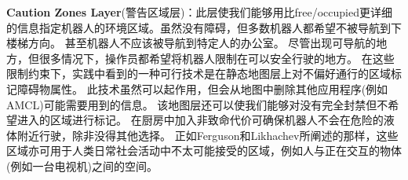 \textbf{\color{blue}Caution Zones Layer}{(警告区域层)}：此层使我们能够用比free/occupied更详细的信息指定机器人的环境区域。虽然没有障碍，但多数机器人都希望不被导航到下楼梯方向。
甚至机器人不应该被导航到特定人的办公室。
尽管出现可导航的地方，但很多情况下，操作员都希望将机器人限制在可以安全行驶的地方。
在这些限制约束下，实践中看到的一种可行技术是在静态地图层上对不偏好通行的区域标记障碍物属性。
此技术虽然可以起作用，但会从地图中删除其他应用程序(例如AMCL)可能需要用到的信息。
该地图层还可以使我们能够对没有完全封禁但不希望进入的区域进行标记。
在厨房中加入非致命代价可确保机器人不会在危险的液体附近行驶，除非没得其他选择。
正如Ferguson和Likhachev所阐述的那样\cite{ferguson2008efficiently}，这些区域亦可用于人类日常社会活动中不太可能接受的区域，例如人与正在交互的物体(例如一台电视机)之间的空间。

